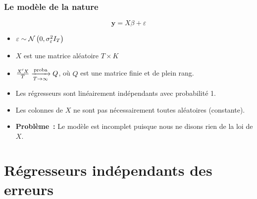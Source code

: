 \documentclass[10pt]{beamer}
\begin{document}
\begin{frame}
  \frametitle{Le modèle de la nature}

  \[ \mathbf y = X\beta + \varepsilon \]

  \begin{itemize}

  \item $\varepsilon \sim \mathcal N\left(0,\sigma_{\varepsilon}^2 I_T\right)$\newline

  \item $X$ est une matrice aléatoire $T\times K$\newline

  \item $\frac{X'X}{T} \xrightarrow[T\rightarrow\infty]{\text{proba}} Q$, où $Q$ est une matrice finie et de plein
    rang.\newline

  \item Les régresseurs sont linéairement indépendants avec probabilité 1.\newline

  \item Les colonnes de $X$ ne sont pas nécessairement toutes aléatoires
    (constante).\newline

  \item \textbf{Problème~:} Le modèle est incomplet puisque nous ne disons rien
    de la loi de $X$.

  \end{itemize}

\end{frame}


\section{Régresseurs indépendants des erreurs}
\end{document}

